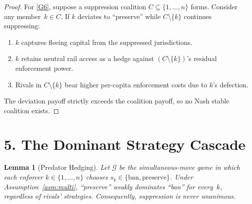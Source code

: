 \documentclass[12pt]{article}
\newtheorem{lemma}[theorem]{Lemma}
\theoremstyle{definition}
\theoremstyle{remark}
\begin{document}
\begin{proof}
For \ref{G6}, suppose a suppression coalition
$C \subseteq \{1, \ldots, n\}$ forms. Consider any member~$k \in C$.
If $k$ deviates to ``preserve'' while $C \setminus \{k\}$ continues
suppressing:
\begin{enumerate}[label=(\alph*)]
  \item $k$ captures fleeing capital from the suppressed jurisdictions.
  \item $k$ retains neutral rail access as a hedge against
    $(C \setminus \{k\})$'s residual enforcement power.
  \item Rivals in $C \setminus \{k\}$ bear higher per-capita
    enforcement costs due to $k$'s defection.
\end{enumerate}
The deviation payoff strictly exceeds the coalition payoff, so no Nash
stable coalition exists.
\end{proof}

\section{5. The Dominant Strategy Cascade}\label{sec:hedging}

\begin{lemma}[Predator Hedging]\label{lem:hedging}
Let $\mathcal{G}$ be the simultaneous-move game in which each enforcer
$k \in \{1, \ldots, n\}$ chooses $s_k \in \{\text{ban}, \text{preserve}\}$.
Under Assumption~\ref{asm:multi}, ``preserve'' weakly dominates ``ban''
for every~$k$, regardless of rivals' strategies. Consequently,
suppression is never unanimous.
\end{lemma}
\end{document}
